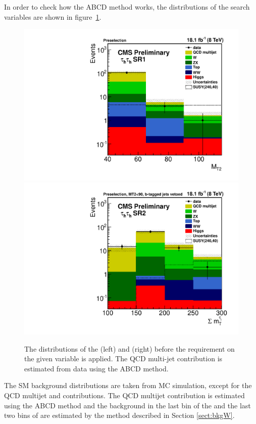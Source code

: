 In order to check how the ABCD method works, the distributions of the search variables are shown in 
figure~\ref{fig:5QCDbg}. 
\begin{figure}[iHhtb]
\centering
\includegraphics[angle=0,scale=0.375]{QCDbginTauTau/QCDWestimation_bin1.pdf}
\includegraphics[angle=0,scale=0.375]{QCDbginTauTau/QCDWestimation_bin2.pdf}
\caption{The distributions of the \mttwo (left) and \SumMT (right) before the requirement on the given variable
is applied. The QCD multi-jet contribution is estimated from data using the ABCD method.}
\label{fig:5QCDbg}
\end{figure}
The SM background distributions are taken from MC simulation, except for 
the QCD multijet and \wjets contributions. The QCD multijet contribution is estimated using the ABCD method
and the \wjets background in the last bin of the \mttwo and the last two bins of \SumMT 
are estimated by the method described in Section \ref{sect:bkgW}.
